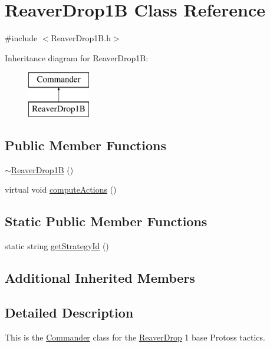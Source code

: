 \hypertarget{class_reaver_drop1_b}{\section{Reaver\-Drop1\-B Class Reference}
\label{class_reaver_drop1_b}
}


{\ttfamily \#include $<$Reaver\-Drop1\-B.\-h$>$}

Inheritance diagram for Reaver\-Drop1\-B\-:\begin{figure}[H]
\begin{center}
\leavevmode
\includegraphics[height=2.000000cm]{class_reaver_drop1_b}
\end{center}
\end{figure}
\subsection*{Public Member Functions}
\begin{DoxyCompactItemize}
\item 
\hyperlink{class_reaver_drop1_b_a8f7ef2759181ff19a26db7946214e8a9}{$\sim$\-Reaver\-Drop1\-B} ()
\item 
virtual void \hyperlink{class_reaver_drop1_b_ac176205b825f62e5947765f8422e1b17}{compute\-Actions} ()
\end{DoxyCompactItemize}
\subsection*{Static Public Member Functions}
\begin{DoxyCompactItemize}
\item 
static string \hyperlink{class_reaver_drop1_b_a1ac82215ce3b666e7d91e300cc8ef2b7}{get\-Strategy\-Id} ()
\end{DoxyCompactItemize}
\subsection*{Additional Inherited Members}


\subsection{Detailed Description}
This is the \hyperlink{class_commander}{Commander} class for the \hyperlink{class_reaver_drop}{Reaver\-Drop} 1 base Protoss tactics.

